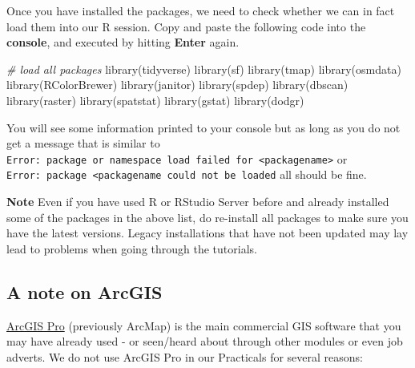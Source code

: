 \documentclass[
]{book}
\newenvironment{Shaded}{\begin{snugshade}}{\end{snugshade}}
\newcommand{\CommentTok}[1]{\textcolor[rgb]{0.56,0.35,0.01}{\textit{#1}}}
\newcommand{\FunctionTok}[1]{\textcolor[rgb]{0.00,0.00,0.00}{#1}}
\newcommand{\NormalTok}[1]{#1}
\begin{document}
Once you have installed the packages, we need to check whether we can in fact load them into our R session. Copy and paste the following code into the \textbf{console}, and executed by hitting \textbf{Enter} again.

\begin{Shaded}
\begin{Highlighting}[]
\CommentTok{\# load all packages}
\FunctionTok{library}\NormalTok{(tidyverse)}
\FunctionTok{library}\NormalTok{(sf)}
\FunctionTok{library}\NormalTok{(tmap)}
\FunctionTok{library}\NormalTok{(osmdata)}
\FunctionTok{library}\NormalTok{(RColorBrewer)}
\FunctionTok{library}\NormalTok{(janitor)}
\FunctionTok{library}\NormalTok{(spdep)}
\FunctionTok{library}\NormalTok{(dbscan)}
\FunctionTok{library}\NormalTok{(raster)}
\FunctionTok{library}\NormalTok{(spatstat)}
\FunctionTok{library}\NormalTok{(gstat)}
\FunctionTok{library}\NormalTok{(dodgr)}
\end{Highlighting}
\end{Shaded}

You will see some information printed to your console but as long as you do not get a message that is similar to \texttt{Error:\ package\ or\ namespace\ load\ failed\ for\ \textless{}packagename\textgreater{}} or \texttt{Error:\ package\ \textquotesingle{}\textless{}packagename\textquotesingle{}\ could\ not\ be\ loaded} all should be fine.

\textbf{Note}
Even if you have used R or RStudio Server before and already installed some of the packages in the above list, do re-install all packages to make sure you have the latest versions. Legacy installations that have not been updated may lay lead to problems when going through the tutorials.

\hypertarget{a-note-on-arcgis}{%
\subsection{A note on ArcGIS}\label{a-note-on-arcgis}}

\href{https://www.esri.com/en-us/arcgis/products/arcgis-pro/overview}{ArcGIS Pro} (previously ArcMap) is the main commercial GIS software that you may have already used - or seen/heard about through other modules or even job adverts. We do not use ArcGIS Pro in our Practicals for several reasons:
\end{document}
